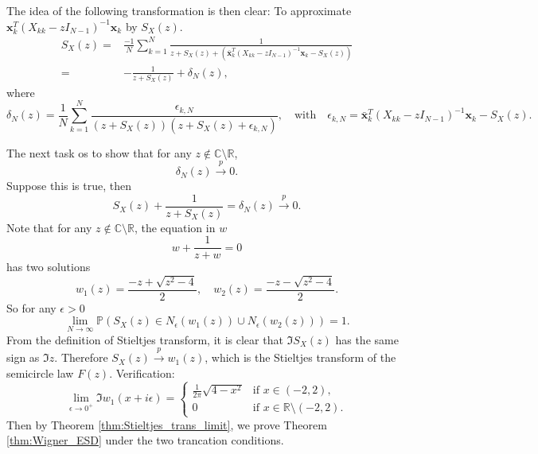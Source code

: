 \documentclass[11pt, a4paper]{article}
\numberwithin{equation}{section}
\newcommand{\compC}{\mathbb{C}}
\newcommand{\realR}{\mathbb{R}}
\newcommand{\toprobab}{\stackrel{p}{\rightarrow}}
\newcommand{\Prob}{\mathbb{P}}
\renewcommand{\vec}[1]{\mathbf{#1}}
\theoremstyle{definition}
\theoremstyle{remark}
\begin{document}
The idea of the following transformation is then clear: To approximate $\vec{x}^T_k (X_{kk} - z I_{N - 1})^{-1} \vec{x}_k$ by $S_X(z)$.
\begin{equation}
  \begin{split}
    S_X(z) = {}& \frac{-1}{N} \sum^N_{k = 1} \frac{1}{z + S_X(z) + (\bar{\vec{x}}^T_k (X_{kk} - z I_{N - 1})^{-1} \vec{x}_k - S_X(z))} \\
    = {}& -\frac{1}{z + S_X(z)} + \delta_N(z),
  \end{split}
\end{equation}
where
\begin{equation}
  \delta_N(z) = \frac{1}{N} \sum^N_{k = 1} \frac{\epsilon_{k, N}}{(z + S_X(z))(z + S_X(z) + \epsilon_{k, N})}, \quad \text{with} \quad \epsilon_{k, N} = \bar{\vec{x}}^T_k (X_{kk} - zI_{N - 1})^{-1} \vec{x}_k - S_X(z).
\end{equation}

The next task os to show that for any $z \notin \compC \setminus \realR$,
\begin{equation} \label{eq:delta_N(z)_vanish}
  \delta_N(z) \toprobab 0.
\end{equation}
Suppose this is true, then
\begin{equation}
  S_X(z) + \frac{1}{z + S_X(z)} = \delta_N(z) \toprobab 0.
\end{equation}
Note that for any $z \notin \compC \setminus \realR$, the equation in $w$
\begin{equation}
  w + \frac{1}{z + w} = 0
\end{equation}
has two solutions
\begin{equation}
  w_1(z) = \frac{-z + \sqrt{z^2 - 4}}{2}, \quad w_2(z) = \frac{-z - \sqrt{z^2 - 4}}{2}.
\end{equation}
So for any $\epsilon > 0$
\begin{equation}
  \lim_{N \to \infty} \Prob(S_X(z) \in N_{\epsilon}(w_1(z)) \cup N_{\epsilon}(w_2(z))) = 1.
\end{equation}
From the definition of Stieltjes transform, it is clear that $\Im S_X(z)$ has the same sign as $\Im z$. Therefore $S_X(z) \toprobab w_1(z)$, which is the Stieltjes transform of the semicircle law $F(z)$. Verification:
\begin{equation}
  \lim_{\epsilon \to 0^+} \Im w_1(x + i\epsilon) =
  \begin{cases}
    \frac{1}{2\pi} \sqrt{4 - x^2} & \text{if $x \in (-2, 2)$,} \\
    0 & \text{if $x \in \realR \setminus (-2, 2)$.}
  \end{cases}
\end{equation}
Then by Theorem \ref{thm:Stieltjes_trans_limit}, we prove Theorem \ref{thm:Wigner_ESD} under the two trancation conditions.
\end{document}
